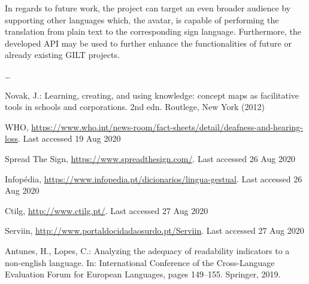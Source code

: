 \documentclass[runningheads]{llncs}
\begin{document}
In regards to future work, the project can target an even broader audience by supporting other languages which, the avatar, is capable of performing the translation from plain text to the corresponding sign language.
Furthermore, the developed API may be used to further enhance the functionalities of future or already existing GILT projects.

\dots

%
%
%
% 
% 
%
\begin{thebibliography}{8}
        Novak, J.: Learning, creating, and using knowledge: concept maps as facilitative tools in schools and corporations. 2nd edn. Routlege, New York (2012)

        WHO, \url{https://www.who.int/news-room/fact-sheets/detail/deafness-and-hearing-loss}. Last accessed 19 Aug 2020

        Spread The Sign, \url{https://www.spreadthesign.com/}. Last accessed 26 Aug 2020

        Infopédia, \url{https://www.infopedia.pt/dicionarios/lingua-gestual}. Last accessed 26 Aug 2020

        Ctilg, \url{http://www.ctilg.pt/}. Last accessed 27 Aug 2020

        Serviin, \url{http://www.portaldocidadaosurdo.pt/Serviin}. Last accessed 27 Aug 2020

        Antunes, H., Lopes, C.: Analyzing the adequacy of readability indicators to a non-english language.
        In: International Conference of the Cross-Language Evaluation Forum for European Languages,
        pages 149--155. Springer, 2019.





\end{thebibliography}
\end{document}
